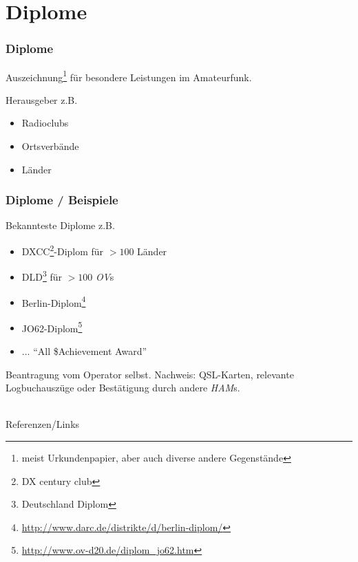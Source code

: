 \section{Diplome}

\begin{frame}
  \frametitle{Diplome}


  Auszeichnung\footnote{meist Urkundenpapier, aber auch diverse andere
  Gegenstände} für besondere Leistungen im Amateurfunk.

  Herausgeber z.B.

  \begin{itemize}
    \item Radioclubs
    \item Ortsverbände
    \item Länder
  \end{itemize}

\end{frame}

\begin{frame}
  \frametitle{Diplome / Beispiele}

  Bekannteste Diplome z.B.

  \begin{itemize}
    \item DXCC\footnote{DX century club}-Diplom für $>100$ Länder
    \item DLD\footnote{Deutschland Diplom} für $>100$ \emph{OV}s
    \item Berlin-Diplom\footnote{\ExternalLink\url{http://www.darc.de/distrikte/d/berlin-diplom/}}
    \item JO62-Diplom\footnote{\ExternalLink\url{http://www.ov-d20.de/diplom_jo62.htm}}
    \item ... ``All \$Achievement Award''
  \end{itemize}

  Beantragung vom Operator selbst. Nachweis: QSL-Karten, relevante
  Logbuchauszüge oder Bestätigung durch andere \emph{HAM}s.

\end{frame}

\renewcommand{\refname}{Referenzen}

\hypertarget{refs}{}
\textcolor{white}{} \\ %
\Large Referenzen/Links
\footnotesize

